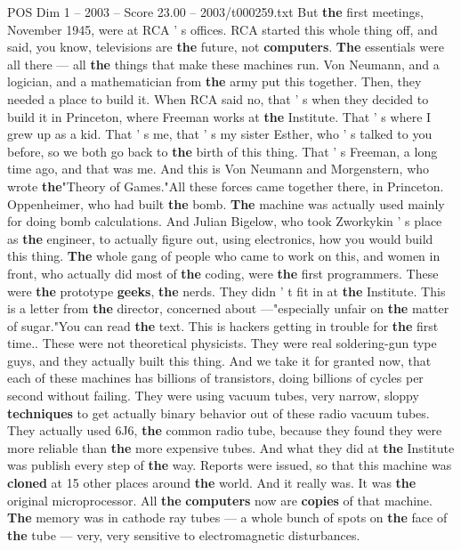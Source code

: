 \begin{textsample}{POS Dim 1 – 2003 – Score 23.00 – 2003/t000259.txt}
But \textbf{the} first meetings, November 1945, were at RCA ' s offices.
RCA started this whole thing off, and said, you know, televisions are \textbf{the} future, not \textbf{computers}. \textbf{The} essentials were all there — all \textbf{the} things that make these machines run.
Von Neumann, and a logician, and a mathematician from \textbf{the} army put this together.
Then, they needed a place to build it.
When RCA said no, that ' s when they decided to build it in Princeton, where Freeman works at \textbf{the} Institute.
That ' s where I grew up as a kid.
That ' s me, that ' s my sister Esther, who ' s talked to you before, so we both go back to \textbf{the} birth of this thing.
That ' s Freeman, a long time ago, and that was me.
And this is Von Neumann and Morgenstern, who wrote \textbf{the}"Theory of Games."All these forces came together there, in Princeton.
Oppenheimer, who had built \textbf{the} bomb. \textbf{The} machine was actually used mainly for doing bomb calculations.
And Julian Bigelow, who took Zworkykin ' s place as \textbf{the} engineer, to actually figure out, using electronics, how you would build this thing. \textbf{The} whole gang of people who came to work on this, and women in front, who actually did most of \textbf{the} coding, were \textbf{the} first programmers.
These were \textbf{the} prototype \textbf{geeks}, \textbf{the} nerds.
They didn ' t fit in at \textbf{the} Institute.
This is a letter from \textbf{the} director, concerned about —"especially unfair on \textbf{the} matter of sugar."You can read \textbf{the} text.
This is hackers getting in trouble for \textbf{the} first time..
These were not theoretical physicists.
They were real soldering-gun type guys, and they actually built this thing.
And we take it for granted now, that each of these machines has billions of transistors, doing billions of cycles per second without failing.
They were using vacuum tubes, very narrow, sloppy \textbf{techniques} to get actually binary behavior out of these radio vacuum tubes.
They actually used 6J6, \textbf{the} common radio tube, because they found they were more reliable than \textbf{the} more expensive tubes.
And what they did at \textbf{the} Institute was publish every step of \textbf{the} way.
Reports were issued, so that this machine was \textbf{cloned} at 15 other places around \textbf{the} world.
And it really was.
It was \textbf{the} original microprocessor.
All \textbf{the} \textbf{computers} now are \textbf{copies} of that machine. \textbf{The} memory was in cathode ray tubes — a whole bunch of spots on \textbf{the} face of \textbf{the} tube — very, very sensitive to electromagnetic disturbances.

\end{textsample}

